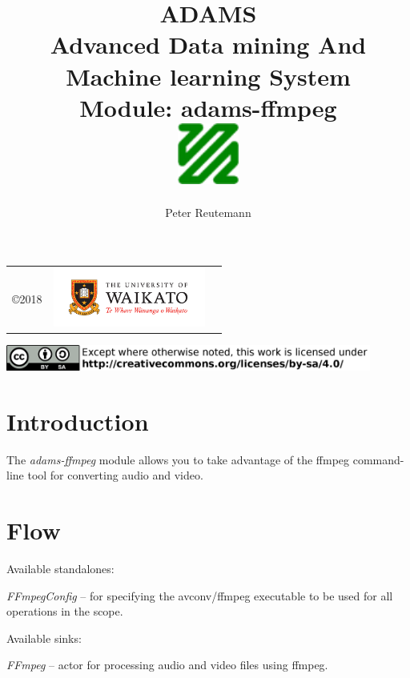 \documentclass[a4paper]{book}
\title{
  \textbf{ADAMS} \\
  {\Large \textbf{A}dvanced \textbf{D}ata mining \textbf{A}nd \textbf{M}achine
  learning \textbf{S}ystem} \\
  {\Large Module: adams-ffmpeg} \\
  \vspace{1cm}
  \includegraphics[width=2cm]{images/ffmpeg-module.png} \\
}
\author{
  Peter Reutemann
}
\begin{document}
\begin{titlepage}
\maketitle

\thispagestyle{empty}
\center
\begin{table}[b]
	\begin{tabular}{c l l}
		\parbox[c][2cm]{2cm}{\copyright 2018} &
		\parbox[c][2cm]{5cm}{\includegraphics[width=5cm]{images/coat_of_arms.pdf}} \\
	\end{tabular}
	\includegraphics[width=12cm]{images/cc.png} \\
\end{table}

\end{titlepage}

\tableofcontents

\chapter{Introduction}
The \textit{adams-ffmpeg} module allows you to take advantage of the 
ffmpeg\cite{ffmpeg} command-line tool for converting audio and video.

\chapter{Flow}

\noindent Available standalones:
\begin{tight_itemize}
  \item \textit{FFmpegConfig} -- for specifying the avconv/ffmpeg executable
  to be used for all operations in the scope.
\end{tight_itemize}

\noindent Available sinks:
\begin{tight_itemize}
  \item \textit{FFmpeg} -- actor for processing audio and video files using
  ffmpeg.
\end{tight_itemize}
\end{document}
